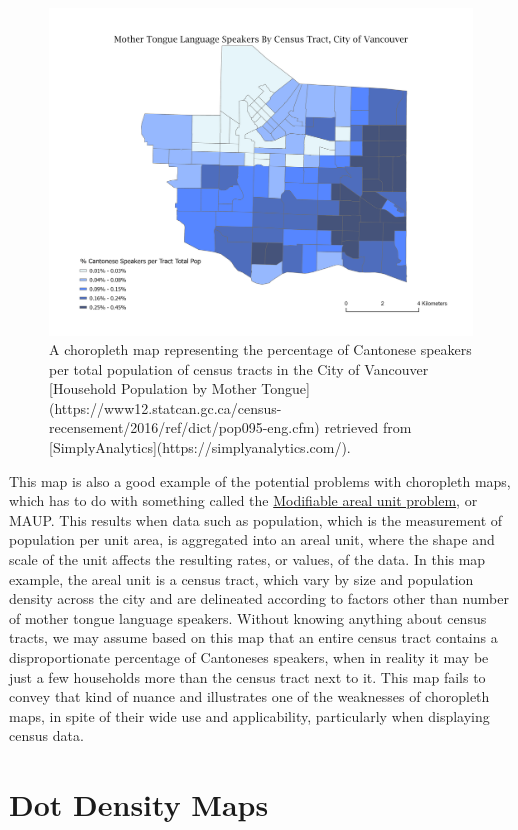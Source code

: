 \documentclass[
]{book}
\begin{document}
\begin{figure}
\includegraphics[width=0.8\linewidth]{images/17-choropleth} \caption{A choropleth map representing the 
percentage of Cantonese speakers per total population of census tracts in the City of Vancouver [Household Population by Mother Tongue](https://www12.statcan.gc.ca/census-recensement/2016/ref/dict/pop095-eng.cfm) retrieved from [SimplyAnalytics](https://simplyanalytics.com/).}\label{fig:17-choropleth}
\end{figure}

This map is also a good example of the potential problems with choropleth maps, which has to do with something called the \href{https://en.wikipedia.org/wiki/Modifiable_areal_unit_problem}{Modifiable areal unit problem}, or MAUP. This results when data such as population, which is the measurement of population per unit area, is aggregated into an areal unit, where the shape and scale of the unit affects the resulting rates, or values, of the data. In this map example, the areal unit is a census tract, which vary by size and population density across the city and are delineated according to factors other than number of mother tongue language speakers. Without knowing anything about census tracts, we may assume based on this map that an entire census tract contains a disproportionate percentage of Cantoneses speakers, when in reality it may be just a few households more than the census tract next to it. This map fails to convey that kind of nuance and illustrates one of the weaknesses of choropleth maps, in spite of their wide use and applicability, particularly when displaying census data.

\hypertarget{dot-density-maps}{%
\section{Dot Density Maps}\label{dot-density-maps}}
\end{document}

